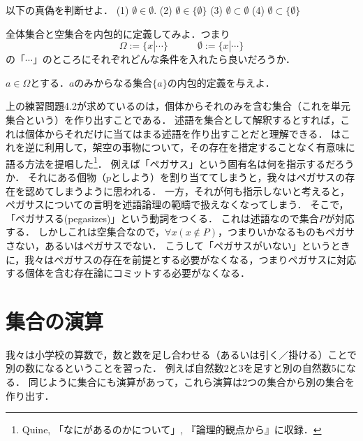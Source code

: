 \documentclass[11pt,a4paper]{jsarticle}
\begin{document}
\begin{exercise}
以下の真偽を判断せよ．
(1) $\emptyset \in \emptyset$. %
(2) $\emptyset \in \{ \emptyset \}$ %
(3) $\emptyset \subset \emptyset$ %
(4) $\emptyset \subset \{ \emptyset \}$ %
\end{exercise}


\begin{exercise}
全体集合と空集合を内包的に定義してみよ．つまり
\[
\Omega := \{ x | \cdots \}  \hspace{3em} \emptyset := \{ x | \cdots \}
\]
の「$\cdots$」のところにそれぞれどんな条件を入れたら良いだろうか． 
\end{exercise}

\begin{exercise}
$a \in \Omega$とする．$a$のみからなる集合$\{a\}$の内包的定義を与えよ． 
\end{exercise}

\begin{example}
上の練習問題4.2が求めているのは，個体からそれのみを含む集合（これを単元集合という）を作り出すことである．
述語を集合として解釈するとすれば，これは個体からそれだけに当てはまる述語を作り出すことだと理解できる．
\cite{Quine1953-yy}はこれを逆に利用して，架空の事物について，その存在を措定することなく有意味に語る方法を提唱した\footnote{Quine, 「なにがあるのかについて」, 『論理的観点から』に収録．}．
例えば「ペガサス」という固有名は何を指示するだろうか．
それにある個物（$p$としよう）を割り当ててしまうと，我々はペガサスの存在を認めてしまうように思われる．
一方，それが何も指示しないと考えると，ペガサスについての言明を述語論理の範疇で扱えなくなってしまう．
そこで，「ペガサスる(pegasizes)」という動詞をつくる．
これは述語なので集合$P$が対応する．
しかしこれは空集合なので，$\forall x (x \not\in P)$，つまりいかなるものもペガサさない，あるいはペガサスでない．
こうして「ペガサスがいない」というときに，我々はペガサスの存在を前提とする必要がなくなる，つまりペガサスに対応する個体を含む存在論にコミットする必要がなくなる．
\end{example}


\section{集合の演算}
\label{sec:setoperation}
我々は小学校の算数で，数と数を足し合わせる（あるいは引く／掛ける）ことで別の数になるということを習った．
例えば自然数2と3を足すと別の自然数5になる．
同じように集合にも演算があって，これら演算は2つの集合から別の集合を作り出す．
\end{document}

